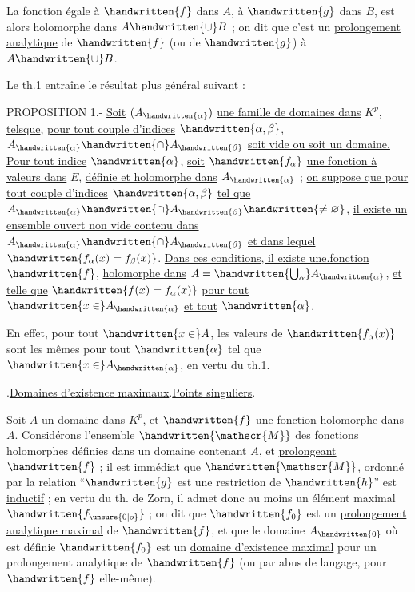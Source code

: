 La fonction égale à $\handwritten{f}$ dans $A$, à $\handwritten{g}$ dans $B$, est alors holomorphe dans $A\handwritten{\cup}B$ ; on dit que c'est un \uline{prolongement analytique} de $\handwritten{f}$ (ou de $\handwritten{g}$) à $A\handwritten{\cup}B$.

Le th.1 entraîne le résultat plus général suivant :

PROPOSITION 1.- \uline{Soit} $(A_{\handwritten{\alpha}})$ \uline{une famille de domaines dans} $K^p$, \uline{telsque}, \uline{pour tout couple d'indices} $\handwritten{\alpha,\beta}$, $A_{\handwritten{\alpha}}\handwritten{\cap}A_{\handwritten{\beta}}$ \uline{soit vide ou soit un domaine. Pour tout indice} $\handwritten{\alpha}$, \uline{soit} $\handwritten{f_\alpha}$ \uline{une fonction à valeurs dans} $E$, \uline{définie et holomorphe dans} $A_{\handwritten{\alpha}}$ ; \uline{on suppose que pour tout couple d'indices} $\handwritten{\alpha,\beta}$ \uline{tel que} $A_{\handwritten{\alpha}}\handwritten{\cap}A_{\handwritten{\beta}}\handwritten{\neq\varnothing}$, \uline{il existe un ensemble ouvert non vide contenu dans} $A_{\handwritten{\alpha}}\handwritten{\cap}A_{\handwritten{\beta}}$ \uline{et dans lequel} $\handwritten{f_\alpha(x)=f_\beta(x)}$. \uline{Dans ces conditions, il existe une.fonction} $\handwritten{f}$, \uline{holomorphe dans} $A=\handwritten{\bigcup_\alpha}A_{\handwritten{\alpha}}$, \uline{et telle que} $\handwritten{f(x)=f_\alpha(x)}$ \uline{pour tout} $\handwritten{x\in}A_{\handwritten{\alpha}}$ \uline{et tout} $\handwritten{\alpha}$.

En effet, pour tout $\handwritten{x\in}A$, les valeurs de $\handwritten{f_\alpha(x)}$ sont les mêmes pour tout $\handwritten{\alpha}$ tel que $\handwritten{x\in}A_{\handwritten{\alpha}}$, en vertu du th.1.

\uline{}.\quad \uline{Domaines d'existence ma\handwritten{-}ximaux}.\quad \uline{Points singuliers}.

Soit $A$ un domaine dans $K^p$, et $\handwritten{f}$ une fonction holomorphe dans $A$. Considérons l'ensemble $\handwritten{\mathscr{M}}$ des fonctions holomorphes définies dans un domaine contenant $A$, et \uline{prolongeant} $\handwritten{f}$ ; il est immédiat que $\handwritten{\mathscr{M}}$, ordonné par la relation ``$\handwritten{g}$ est une restriction de $\handwritten{h}$'' est \uline{inductif} ; en vertu du th. de Zorn, il admet donc au moins un élément maximal $\handwritten{f_{\unsure{0|o}}}$ ;  on dit que $\handwritten{f_{0}}$ est un \uline{prolongement analytique maximal} de $\handwritten{f}$, et que le domaine $A_{\handwritten{0}}$ où est définie $\handwritten{f_{0}}$ est un \uline{domaine d'existence maximal} pour un prolongement analytique de $\handwritten{f}$ (ou par abus de langage, pour $\handwritten{f}$ elle-même).

